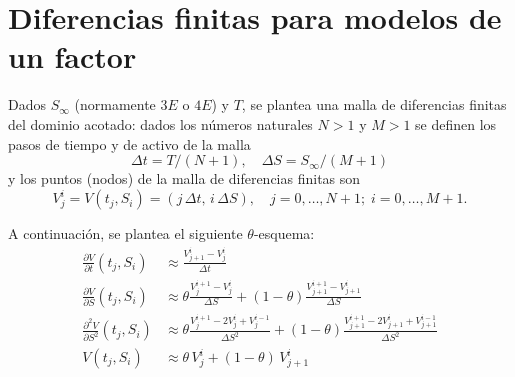 \section{Diferencias finitas para modelos de un factor}
Dados $S_\infty$ (normamente $3E$ o $4E$) y $T$, se plantea una malla de diferencias finitas del dominio acotado: dados los números naturales $N > 1$ y $M > 1$ se definen los pasos de tiempo y de activo de la malla
\begin{equation*}
    \Delta t = T/(N+1), \quad \Delta S = S_\infty/(M+1)
\end{equation*}
y los puntos (nodos) de la malla de diferencias finitas son
\begin{equation*}
    V_j^i = V(t_j, S_i) = (j\,\Delta t,\, i\,\Delta S), \quad j = 0, \ldots, N+1;\; i = 0, \ldots, M+1.
\end{equation*}

A continuación, se plantea el siguiente $\theta$-esquema:
\begin{align*}
    \frac{\partial V}{\partial t}\left(t_j, S_i\right) &\approx \frac{V_{j+1}^i - V_j^i}{\Delta t} \\
    \frac{\partial V}{\partial S}\left(t_j, S_i\right) &\approx \theta \frac{V_j^{i+1} - V_j^i}{\Delta S} + (1-\theta) \frac{V_{j+1}^{i+1} - V_{j+1}^i}{\Delta S} \\
    \frac{\partial^2 V}{\partial S^2}\left(t_j, S_i\right) &\approx \theta \frac{V_j^{i+1} - 2V_j^i + V_j^{i-1}}{\Delta S^2}  + (1-\theta) \frac{V_{j+1}^{i+1} - 2V_{j+1}^i + V_{j+1}^{i-1}}{\Delta S^2} \\
    V\left(t_j, S_i\right) &\approx \theta\, V_j^i + (1-\theta)\, V_{j+1}^i
\end{align*}

